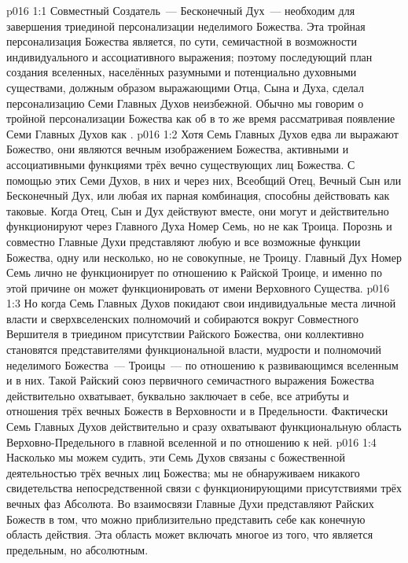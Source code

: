 \vs p016 1:1 Совместный Создатель~--- Бесконечный Дух~--- необходим для завершения триединой персонализации неделимого Божества. Эта тройная персонализация Божества является, по сути, семичастной в возможности индивидуального и ассоциативного выражения; поэтому последующий план создания вселенных, населённых разумными и потенциально духовными существами, должным образом выражающими Отца, Сына и Духа, сделал персонализацию Семи Главных Духов неизбежной. Обычно мы говорим о тройной персонализации Божества как об  в то же время рассматривая появление Семи Главных Духов как .
\vs p016 1:2 Хотя Семь Главных Духов едва ли выражают  Божество, они являются вечным изображением  Божества, активными и ассоциативными функциями трёх вечно существующих лиц Божества. С помощью этих Семи Духов, в них и через них, Всеобщий Отец, Вечный Сын или Бесконечный Дух, или любая их парная комбинация, способны действовать как таковые. Когда Отец, Сын и Дух действуют вместе, они могут и действительно функционируют через Главного Духа Номер Семь, но не как Троица. Порознь и совместно Главные Духи представляют любую и все возможные функции Божества, одну или несколько, но не совокупные, не Троицу. Главный Дух Номер Семь лично не функционирует по отношению к Райской Троице, и именно по этой причине он может функционировать  от имени Верховного Существа.
\vs p016 1:3 Но когда Семь Главных Духов покидают свои индивидуальные места личной власти и сверхвселенских полномочий и собираются вокруг Совместного Вершителя в триедином присутствии Райского Божества, они коллективно становятся представителями функциональной власти, мудрости и полномочий неделимого Божества~--- Троицы~--- по отношению к развивающимся вселенным и в них. Такой Райский союз первичного семичастного выражения Божества действительно охватывает, буквально заключает в себе, все атрибуты и отношения трёх вечных Божеств в Верховности и в Предельности. Фактически Семь Главных Духов действительно и сразу охватывают функциональную область Верховно\hyp{}Предельного в главной вселенной и по отношению к ней.
\vs p016 1:4 Насколько мы можем судить, эти Семь Духов связаны с божественной деятельностью трёх вечных лиц Божества; мы не обнаруживаем никакого свидетельства непосредственной связи с функционирующими присутствиями трёх вечных фаз Абсолюта. Во взаимосвязи Главные Духи представляют Райских Божеств в том, что можно приблизительно представить себе как конечную область действия. Эта область может включать многое из того, что является предельным, но  абсолютным.

